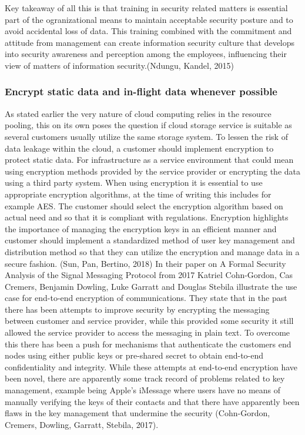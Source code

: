 \documentclass{article}
\begin{document}
\par
Key takeaway of all this is that training in security related matters is essential part of the ogranizational means to maintain acceptable security posture and to avoid accidental loss of data. This training combined with the commitment and attitude from management can create information security culture that develops into security awareness and perception among the employees, influencing their view of matters of information security.(Ndungu, Kandel, 2015) 
\subsubsection{Encrypt static data and in-flight data whenever possible}
As stated earlier the very nature of cloud computing relies in the resource pooling, this on its own poses the question if cloud storage service is suitable as several customers usually utilize the same storage system. To lessen the risk of data leakage within the cloud, a customer should implement encryption to protect static data. For infrastructure as a service environment that could mean using encryption methods provided by the service provider or encrypting the data using a third party system. When using encryption it is essential to use appropriate encryption algorithms, at the time of writing this includes for example AES. The customer should select the encryption algorithm based on actual need and so that it is compliant with regulations. Encryption highlights the importance of managing the encryption keys in an efficient manner and customer should implement a standardized method of user key management and distribution method so that they can utilize the encryption and manage data in a secure fashion. (Sun, Pan, Bertino, 2018)
In their paper on A Formal Security Analysis of the Signal Messaging Protocol from 2017 Katriel Cohn-Gordon, Cas Cremers, Benjamin Dowling, Luke Garratt and Douglas Stebila illustrate the use case for end-to-end encryption of communications.
They state that in the past there has been attempts to improve security by encrypting the messaging between customer and service provider, while this provided some security it still allowed the service provider to access the messaging in plain text.
To overcome this there has been a push for mechanisms that authenticate the customers end nodes using either public keys or pre-shared secret to obtain end-to-end confidentiality and integrity.
While these attempts at end-to-end encryption have been novel, there are apparently some track record of problems related to key management, example being Apple's iMessage where users have no means of manually verifying the keys of their contacts and that there have apparently been flaws in the key management that undermine the security (Cohn-Gordon, Cremers, Dowling, Garratt, Stebila, 2017).
\end{document}
